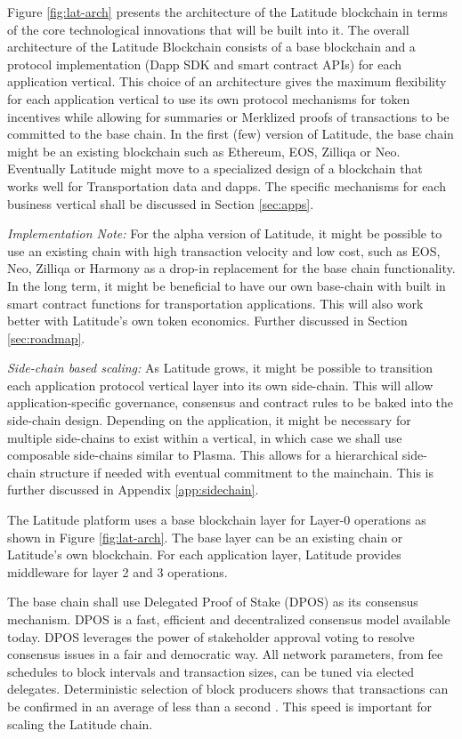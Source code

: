Figure \ref{fig:lat-arch} presents the architecture of the Latitude blockchain in terms of the core technological
innovations that will be built into it. The overall architecture of the Latitude Blockchain consists of a base
blockchain and a protocol implementation (Dapp SDK and smart contract APIs) for each application vertical. This choice
of an architecture gives the maximum flexibility for each application vertical to use its own protocol mechanisms for
token incentives while allowing for summaries or Merklized proofs of transactions to be committed to the base chain. In
the first (few) version of Latitude, the base chain might be an existing blockchain such as Ethereum, EOS, Zilliqa or
Neo. Eventually Latitude might move to a specialized design of a blockchain that works well for Transportation data and
dapps. The specific mechanisms for each business vertical shall be discussed in Section \ref{sec:apps}.

{\em Implementation Note:} For the alpha version of Latitude, it might be possible to use an existing chain with high
transaction velocity and low cost, such as EOS, Neo, Zilliqa or Harmony as a drop-in replacement for the base chain
functionality. In the long term, it might be beneficial to have our own base-chain with built in smart contract
functions for transportation applications. This will also work better with Latitude's own token economics. Further
discussed in Section \ref{sec:roadmap}.

{\em Side-chain based scaling:} As Latitude grows, it might be possible to transition each application protocol vertical
layer into its own side-chain. This will allow application-specific governance, consensus and contract rules to be baked
into the side-chain design. Depending on the application, it might be necessary for multiple side-chains to exist within
a vertical, in which case we shall use composable side-chains similar to Plasma. This allows for a hierarchical
side-chain structure if needed with eventual commitment to the mainchain. This is further discussed in Appendix
\ref{app:sidechain}.

 The Latitude platform uses a base blockchain layer for Layer-0
operations as shown in Figure \ref{fig:lat-arch}. The base layer can be an existing chain or Latitude's own blockchain.
For each application layer, Latitude provides middleware for layer 2 and 3 operations.

The base chain shall use Delegated Proof of Stake (DPOS) as its consensus mechanism.  DPOS is a fast, efficient and
decentralized consensus model available today. DPOS leverages the power of stakeholder approval voting to resolve
consensus issues in a fair and democratic way. All network parameters, from fee schedules to block intervals and
transaction sizes, can be tuned via elected delegates.  Deterministic selection of block producers shows that
transactions can be confirmed in an average of less than a second \cite{eos_producers}. This speed is important for
scaling the Latitude chain.

